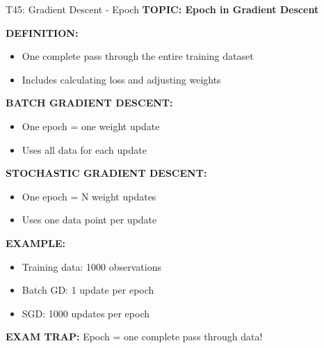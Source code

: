 \documentclass[8pt]{beamer}
\begin{document}
	\begin{frame}{T45: Gradient Descent - Epoch}
		\fontsize{6.5}{7.5}\selectfont
		\textbf{TOPIC: Epoch in Gradient Descent}
		
		\vspace{0.1cm}
		\textbf{DEFINITION:}
		\begin{itemize}
			\item One complete pass through the entire training dataset
			\item Includes calculating loss and adjusting weights
		\end{itemize}
		
		\vspace{0.1cm}
		\textbf{BATCH GRADIENT DESCENT:}
		\begin{itemize}
			\item One epoch = one weight update
			\item Uses all data for each update
		\end{itemize}
		
		\vspace{0.1cm}
		\textbf{STOCHASTIC GRADIENT DESCENT:}
		\begin{itemize}
			\item One epoch = N weight updates
			\item Uses one data point per update
		\end{itemize}
		
		\vspace{0.1cm}
		\textbf{EXAMPLE:}
		\begin{itemize}
			\item Training data: 1000 observations
			\item Batch GD: 1 update per epoch
			\item SGD: 1000 updates per epoch
		\end{itemize}
		
		\textcolor{myred}{\textbf{EXAM TRAP:}} Epoch = \textcolor{myblue}{one complete pass} through data!
	\end{frame}
	
\end{document}
